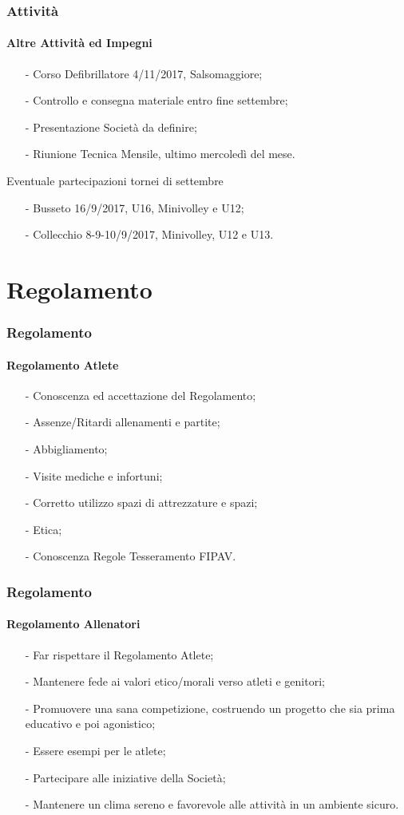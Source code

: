 \documentclass{beamer}
\begin{document}
\begin{frame}
\frametitle{Attività}
\framesubtitle{Altre Attività ed Impegni}
\begin{itemize}
\item[-]Corso Defibrillatore 4/11/2017, Salsomaggiore;
\item[-]Controllo e consegna materiale entro fine settembre;
\item[-]Presentazione Società da definire;
\item[-]Riunione Tecnica Mensile, ultimo mercoledì del mese.
\end{itemize}

\begin{block}{Eventuale partecipazioni tornei di settembre}
\begin{itemize}
\item[-]Busseto 16/9/2017, U16, Minivolley e U12;
\item[-]Collecchio 8-9-10/9/2017, Minivolley, U12 e U13.
\end{itemize}
\end{block}
\end{frame}

\section{Regolamento}


\begin{frame}
\frametitle{Regolamento}
\framesubtitle{Regolamento Atlete}
\begin{itemize}
\item[-]Conoscenza ed accettazione del Regolamento;
\item[-]Assenze/Ritardi allenamenti e partite;
\item[-]Abbigliamento;
\item[-]Visite mediche e infortuni;
\item[-]Corretto utilizzo spazi di attrezzature e spazi;
\item[-]Etica;
\item[-]Conoscenza Regole Tesseramento FIPAV.
\end{itemize}
\end{frame}


\begin{frame}
\frametitle{Regolamento}
\framesubtitle{Regolamento Allenatori}
\begin{itemize}[<+->]
\item[-]Far rispettare il Regolamento Atlete;
\item[-]Mantenere fede ai valori etico/morali verso atleti e genitori;
\item[-]Promuovere una sana competizione, costruendo un progetto che sia prima educativo e poi agonistico;
\item[-]Essere esempi per le atlete;
\item[-]Partecipare alle iniziative della Società;
\item[-]Mantenere un clima sereno e favorevole alle attività in un ambiente sicuro.
\end{itemize}
\end{frame}
\end{document}
